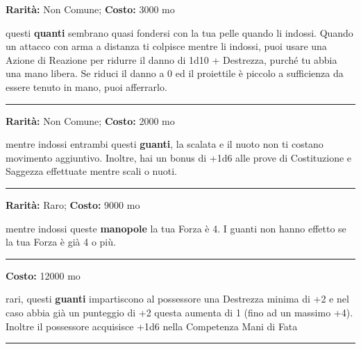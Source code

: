 \begin{multicols}{2}
\textbf{Rarità:} Non Comune; \textbf{Costo:} 3000 mo

questi \textbf{quanti} sembrano quasi fondersi con la tua pelle quando li indossi. Quando un attacco con arma a distanza ti colpisce mentre li indossi, puoi usare una Azione di Reazione per ridurre il danno di 1d10 + Destrezza, purché tu abbia una mano libera. Se riduci il danno a 0 ed il proiettile è piccolo a sufficienza da essere tenuto in mano, puoi afferrarlo.

\smallskip\noindent\rule{\linewidth}{2pt}  \hypertarget{GuantidelNuotoedellaScalata}{}\medskip{}\noindent\label{GuantidelNuotoedellaScalata}

\textbf{Rarità:} Non Comune; \textbf{Costo:} 2000 mo

mentre indossi entrambi questi \textbf{guanti}, la scalata e il nuoto non ti costano movimento aggiuntivo. Inoltre, hai un bonus di +1d6 alle prove di Costituzione e Saggezza effettuate mentre scali o nuoti.

\smallskip\noindent\rule{\linewidth}{2pt}  \hypertarget{GuantidelPotereorchesco}{}\medskip{}\noindent\label{GuantidelPotereorchesco}

\textbf{Rarità:} Raro; \textbf{Costo:} 9000 mo

mentre indossi queste \textbf{manopole} la tua Forza è 4. I guanti non hanno effetto se la tua Forza è già 4 o più.

\smallskip\noindent\rule{\linewidth}{2pt}  \hypertarget{GuantidellaDestrezza}{}\medskip{}\noindent\label{GuantidellaDestrezza}

\textbf{Costo:} 12000 mo

rari, questi \textbf{guanti} impartiscono al possessore una Destrezza minima di +2 e nel caso abbia già un punteggio di +2 questa aumenta di 1 (fino ad un massimo +4). Inoltre il possessore acquisisce +1d6 nella Competenza Mani di Fata

\smallskip\noindent\rule{\linewidth}{2pt}  \hypertarget{GuantiMaldestri}{}\medskip{}\noindent\label{GuantiMaldestri}


\end{multicols}
